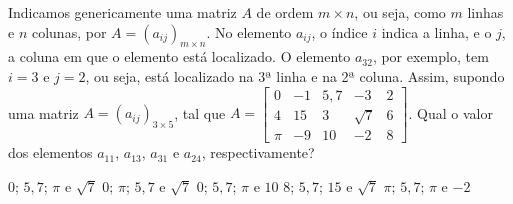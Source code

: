 Indicamos genericamente uma matriz $A$ de ordem $m\times n$, ou seja, como $m$ linhas e $n$ colunas, por $A=(a_{ij})_{m\times n}$. No elemento $a_{ij}$, o índice $i$ indica a linha, e o $j$, a coluna em que o elemento está localizado. O elemento $a_{32}$, por exemplo, tem $i=3$ e $j=2$, ou seja, está localizado na 3ª linha e na 2ª coluna. Assim, supondo uma matriz $A=(a_{ij})_{3\times 5}$, tal que $A = \left[\begin{array}{ccccc}
0 & -1 & 5{,}7 & -3 & 2 \\
4 & 15 & 3 & \sqrt{7} & 6 \\
\pi & -9 & 10 & -2 & 8
\end{array}\right]$. Qual o valor dos elementos $a_{11}$, $a_{13}$, $a_{31}$ e $a_{24}$, respectivamente?

$0$; $5{,}7$; $\pi$ e $\sqrt{7}$
$0$; $\pi$; $5{,}7$ e $\sqrt{7}$
$0$; $5{,}7$; $\pi$ e $10$
$8$; $5{,}7$; $15$ e $\sqrt{7}$
$\pi$; $5{,}7$; $\pi$ e $-2$


